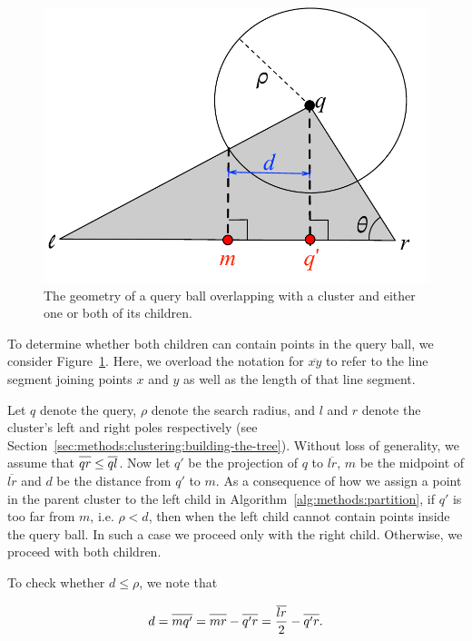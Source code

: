 \begin{figure}[ht!]
    \centering
    \includegraphics[scale=0.8]{images/geometry/overlapping-children-3.pdf}
    \caption{The geometry of a query ball overlapping with a cluster and either one or both of its children.}
    \label{fig:methods:overlapping-children}
\end{figure}

To determine whether both children can contain points in the query ball, we consider Figure~\ref{fig:methods:overlapping-children}.
Here, we overload the notation for $\overline{x y}$ to refer to the line segment joining points $x$ and $y$ as well as the length of that line segment.

Let $q$ denote the query, $\rho$ denote the search radius, and $l$ and $r$ denote the cluster's left and right poles respectively (see Section~\ref{sec:methods:clustering:building-the-tree}).
Without loss of generality, we assume that $\overline{q r \vphantom{l}} \leq \overline{q l}$.
Now let $q'$ be the projection of $q$ to $\overline{l r}$, $m$ be the midpoint of $\overline{l r}$ and $d$ be the distance from $q'$ to $m$.
As a consequence of how we assign a point in the parent cluster to the left child in Algorithm~\ref{alg:methods:partition}, if $q'$ is too far from $m$, i.e. $\rho < d$, then when the left child cannot contain points inside the query ball.
In such a case we proceed only with the right child.
Otherwise, we proceed with both children.

To check whether $d \leq \rho$, we note that

\begin{equation*}
    d = \overline{m q' \vphantom{l}} = \overline{m r \vphantom{l}} - \overline{q' r \vphantom{l}} = \frac{\overline{l r}}{2} - \overline{q' r \vphantom{l}}.
\end{equation*}

